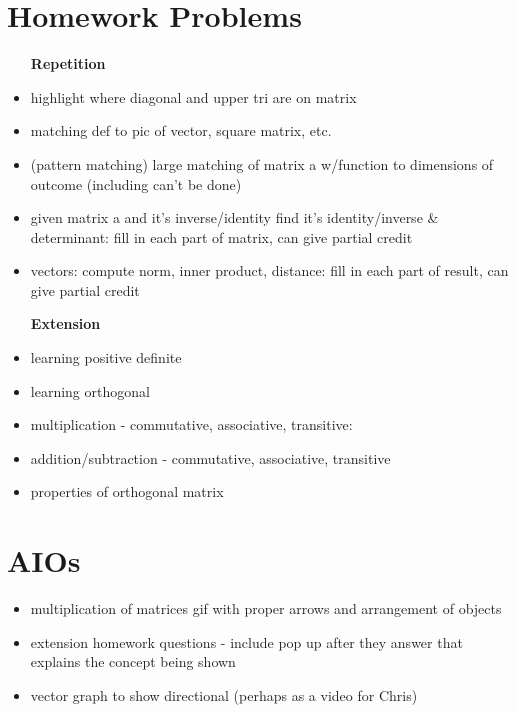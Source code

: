 \documentclass[a4paper]{article}
\begin{document}
  \section{Homework Problems}
  	\begin{itemize} 
    	\item [\textbf{Repetition}]
     	\item highlight where diagonal and upper tri are on matrix
        \item matching def to pic of vector, square matrix, etc.
        \item (pattern matching) large matching of matrix a w/function to dimensions of outcome (including can't be done)
        \item given matrix a and it's inverse/identity find it's identity/inverse \& determinant: fill in each part of matrix, can give partial credit
        \item vectors: compute norm, inner product, distance: fill in each part of result, can give partial credit
  	\end{itemize}
  	\begin{itemize} 
    	\item [\textbf{Extension}]
    	\item learning positive definite
        \item learning orthogonal
        \item multiplication - commutative, associative, transitive: 
        \item addition/subtraction - commutative, associative, transitive
        \item properties of orthogonal matrix
    \end{itemize}
    
  \section{AIOs}
	\begin{itemize}
    \item multiplication of matrices gif with proper arrows and arrangement of objects
    \item extension homework questions - include pop up after they answer that explains the concept being shown
    \item vector graph to show directional (perhaps as a video for Chris)
    \end{itemize}
    
        
\end{document}
